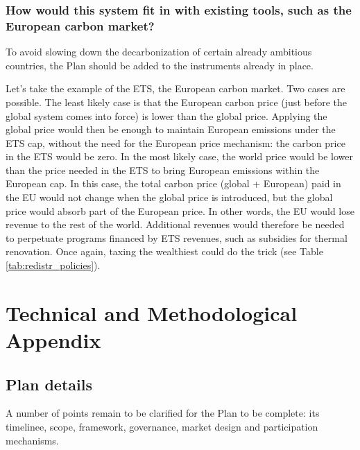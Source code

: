 \documentclass[a5paper,english,openany]{memoir}
\begin{document}
\section*{\normalsize How would this system fit in with existing tools, such as the European carbon market?}\label{q:ets}

To avoid slowing down the decarbonization of certain already ambitious countries, the Plan should be added to the instruments already in place. 

Let's take the example of the ETS, the European carbon market. Two cases are possible. The least likely case is that the European carbon price (just before the global system comes into force) is lower than the global price. Applying the global price would then be enough to maintain European emissions under the ETS cap, without the need for the European price mechanism: the carbon price in the ETS would be zero. In the most likely case, the world price would be lower than the price needed in the ETS to bring European emissions within the European cap. In this case, the total carbon price (global + European) paid in the EU would not change when the global price is introduced, but the global price would absorb part of the European price. In other words, the EU would lose revenue to the rest of the world. Additional revenues would therefore be needed to perpetuate programs financed by ETS revenues, such as subsidies for thermal renovation. Once again, taxing the wealthiest could do the trick (see Table \ref{tab:redistr_policies}).


\appendix

\part*{Technical and Methodological Appendix}\label{annex}

\chapter{Plan details\label{ch:details}} 

A number of points remain to be clarified for the Plan to be complete: its timelinee, scope, framework, governance, market design and participation mechanisms. 
\end{document}

